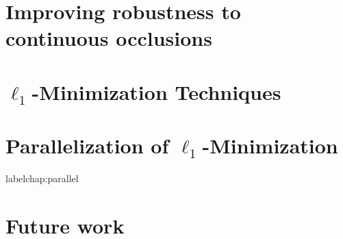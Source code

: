 \documentclass[draftthesis,tocnosub,noragright,centerchapter,12pt]{uiucecethesis09}
\begin{document}
\chapter{Improving robustness to continuous occlusions}
\label{chap:iccv}


\chapter{$\ell_1$-Minimization Techniques}
\label{chap:minimization}
%
%

\chapter{Parallelization of $\ell_1$-Minimization}
label{chap:parallel}
%

\chapter{Future work}
\label{chap:future}

%

\backmatter



\end{document}
